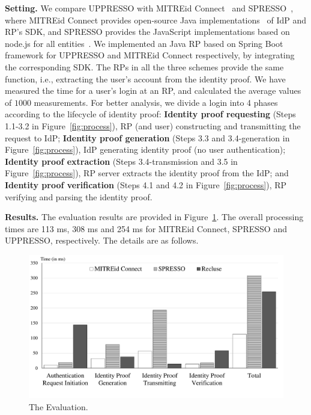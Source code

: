 \noindent\textbf{Setting.}
We compare UPPRESSO with MITREid Connect~\cite{MITREid} and SPRESSO~\cite{SPRESSO}, where MITREid Connect provides open-source Java implementations~\cite{MITREid} of IdP and RP's SDK, and SPRESSO provides the JavaScript implementations based on node.js for all entities~\cite{SPRESSO}.
We implemented an Java RP based on Spring Boot framework for UPPRESSO and MITREid Connect respectively, by integrating the corresponding SDK.
The RPs in all the three schemes provide the same function, i.e.,   extracting the user's account from the identity proof.
We have measured the time for a user's login at an RP, and calculated the average values of $1000$ measurements.
For better analysis, we divide a login into 4 phases according to the lifecycle of identity proof: \textbf{Identity proof requesting} (Steps 1.1-3.2 in Figure~\ref{fig:process}), RP (and user) constructing and transmitting the request to IdP; \textbf{Identity proof generation} (Steps 3.3 and 3.4-generation in Figure~\ref{fig:process}), IdP generating identity proof (no user authentication); \textbf{Identity proof extraction} (Steps 3.4-transmission and 3.5 in Figure~\ref{fig:process}), RP server extracts the identity proof from the IdP; and \textbf{Identity proof verification} (Steps 4.1 and 4.2 in Figure~\ref{fig:process}), RP verifying and parsing the identity proof.

\noindent\textbf{Results.}
The evaluation results are provided in Figure~\ref{fig:evaluation}. The overall processing times are  113 ms, 308 ms and 254 ms for MITREid Connect, SPRESSO and UPPRESSO, respectively. The details are as follows.

\begin{figure}
  \centering
  \includegraphics[width=\linewidth]{fig/evaluation2.pdf}
  \caption{The Evaluation.}
  \label{fig:evaluation}
\end{figure}

